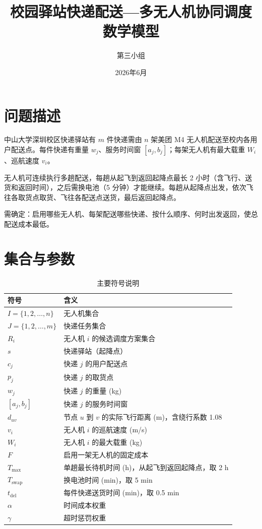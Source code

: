 \documentclass[12pt,a4paper]{article}
\title{校园驿站快递配送---多无人机协同调度\\数学模型}
\author{第三小组}
\date{2026年6月}
\begin{document}
\maketitle

\section{问题描述}

中山大学深圳校区快递驿站有 $m$ 件快递需由 $n$ 架美团 M4 无人机配送至校内各用户配送点。每件快递有重量 $w_j$、服务时间窗 $[a_j, b_j]$；每架无人机有最大载重 $W_i$、巡航速度 $v_i$。

无人机可连续执行多趟配送，每趟从起飞到返回起降点最长 2 小时（含飞行、送货和返回时间），之后需换电池（5 分钟）才能继续。每趟从起降点出发，依次飞往各取货点取货、飞往各配送点送货，最后返回起降点。

需确定：启用哪些无人机、每架配送哪些快递、按什么顺序、何时出发返回，使总配送成本最低。

\section{集合与参数}

\begin{table}[h]
\centering
\caption{主要符号说明}
\begin{tabular}{ll}
\toprule
符号 & 含义 \\
\midrule
$I = \{1,2,\ldots,n\}$ & 无人机集合 \\
$J = \{1,2,\ldots,m\}$ & 快递任务集合 \\
$R_i$ & 无人机 $i$ 的候选调度方案集合 \\
$s$ & 快递驿站（起降点） \\
$c_j$ & 快递 $j$ 的用户配送点 \\
$p_j$ & 快递 $j$ 的取货点 \\
$w_j$ & 快递 $j$ 的重量 (kg) \\
$[a_j, b_j]$ & 快递 $j$ 的服务时间窗 \\
$d_{uv}$ & 节点 $u$ 到 $v$ 的实际飞行距离 (m)，含绕行系数 1.08 \\
$v_i$ & 无人机 $i$ 的巡航速度 (m/s) \\
$W_i$ & 无人机 $i$ 的最大载重 (kg) \\
$F$ & 启用一架无人机的固定成本 \\
$T_{\max}$ & 单趟最长待机时间 (h)，从起飞到返回起降点，取 2 h \\
$T_{\text{swap}}$ & 换电池时间 (min)，取 5 min \\
$t_{\text{del}}$ & 每件快递送货时间 (min)，取 0.5 min \\
$\alpha$ & 时间成本权重 \\
$\gamma$ & 超时惩罚权重 \\
\bottomrule
\end{tabular}
\end{table}
\end{document}
